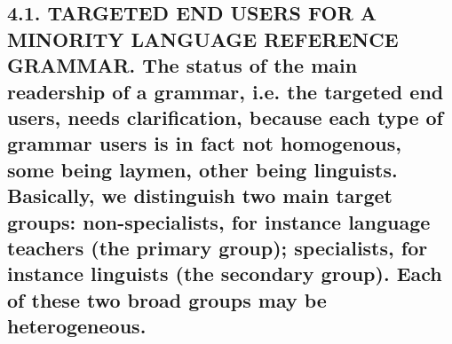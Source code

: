 \documentclass[letterpaper]{article}
\begin{document}
\subsection[4.1. TARGETED END USERS FOR A MINORITY LANGUAGE REFERENCE GRAMMAR. The status of the main readership of a grammar, i.e. the targeted end users, needs clarification, because each type of grammar users is in fact not homogenous, some being laymen, other being linguists. Basically, we distinguish two main target groups: non{}-specialists, for instance language teachers (the primary group); specialists, for instance linguists (the secondary group). Each of these two broad groups may be heterogeneous.]{4.1. TARGETED END USERS FOR A MINORITY LANGUAGE REFERENCE GRAMMAR. \textmd{The}\textmd{ status of }\textmd{the }\textmd{main }\textmd{readership }\textmd{of a grammar, }\textmd{i.e. the }\textmd{targeted}\textmd{ end users}\textmd{,}\textmd{ needs clarification, because each }\textmd{type }\textmd{of grammar users is in fact not homogenous, }\textmd{some }\textmd{being layme}\textmd{n, other being}\textmd{ linguists.}\textmd{ }\textmd{Basically, w}\textmd{e distinguish two main target groups: }\textmd{non-specialists, for instance }\textmd{language teachers (}\textmd{the }\textmd{primary group); specialists, for instance linguists (}\textmd{the }\textmd{secondary group).}\textmd{ Each of these two broad groups may }\textmd{be }\textmd{heterogeneous}\textmd{.}}
\end{document}
